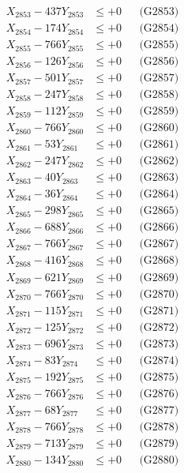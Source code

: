 \documentclass[a4paper,10pt]{article}
\begin{document}
{\begin{align}
X_{2853} - 437Y_{2853} &\leq +0 && \text{(G2853)} \\
X_{2854} - 174Y_{2854} &\leq +0 && \text{(G2854)} \\
X_{2855} - 766Y_{2855} &\leq +0 && \text{(G2855)} \\
X_{2856} - 126Y_{2856} &\leq +0 && \text{(G2856)} \\
X_{2857} - 501Y_{2857} &\leq +0 && \text{(G2857)} \\
X_{2858} - 247Y_{2858} &\leq +0 && \text{(G2858)} \\
X_{2859} - 112Y_{2859} &\leq +0 && \text{(G2859)} \\
X_{2860} - 766Y_{2860} &\leq +0 && \text{(G2860)} \\
\allowbreak
X_{2861} - 53Y_{2861} &\leq +0 && \text{(G2861)} \\
X_{2862} - 247Y_{2862} &\leq +0 && \text{(G2862)} \\
X_{2863} - 40Y_{2863} &\leq +0 && \text{(G2863)} \\
X_{2864} - 36Y_{2864} &\leq +0 && \text{(G2864)} \\
X_{2865} - 298Y_{2865} &\leq +0 && \text{(G2865)} \\
X_{2866} - 688Y_{2866} &\leq +0 && \text{(G2866)} \\
X_{2867} - 766Y_{2867} &\leq +0 && \text{(G2867)} \\
X_{2868} - 416Y_{2868} &\leq +0 && \text{(G2868)} \\
X_{2869} - 621Y_{2869} &\leq +0 && \text{(G2869)} \\
X_{2870} - 766Y_{2870} &\leq +0 && \text{(G2870)} \\
\allowbreak
X_{2871} - 115Y_{2871} &\leq +0 && \text{(G2871)} \\
X_{2872} - 125Y_{2872} &\leq +0 && \text{(G2872)} \\
X_{2873} - 696Y_{2873} &\leq +0 && \text{(G2873)} \\
X_{2874} - 83Y_{2874} &\leq +0 && \text{(G2874)} \\
X_{2875} - 192Y_{2875} &\leq +0 && \text{(G2875)} \\
X_{2876} - 766Y_{2876} &\leq +0 && \text{(G2876)} \\
X_{2877} - 68Y_{2877} &\leq +0 && \text{(G2877)} \\
X_{2878} - 766Y_{2878} &\leq +0 && \text{(G2878)} \\
X_{2879} - 713Y_{2879} &\leq +0 && \text{(G2879)} \\
X_{2880} - 134Y_{2880} &\leq +0 && \text{(G2880)} \\

\end{align}}
\end{document}
